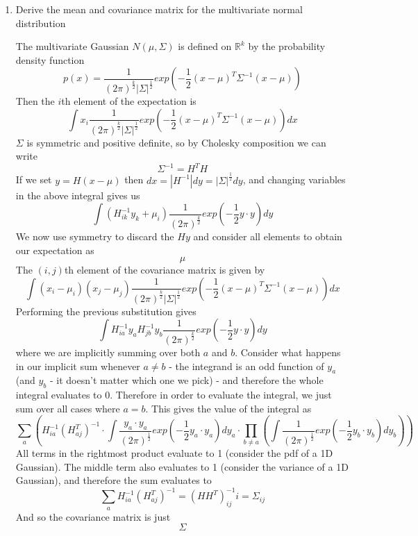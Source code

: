 \documentclass{article}
\newcommand{\chapternumber}{2}
\newenvironment{QandA}{\begin{enumerate}[label=\chapternumber.\arabic*]\bfseries\boldmath}
	{\end{enumerate}}
\newenvironment{answered}{\par\bigskip\normalfont\unboldmath}{}
\begin{document}
\begin{QandA}
		\item Derive the mean and covariance matrix for the multivariate normal distribution
		\begin{answered}
			The multivariate Gaussian $N(\mu,\Sigma)$ is defined on $\mathbb{R}^k$ by the probability density function
			\[p(x)=\frac{1}{(2\pi)^{\frac{k}{2}}|\Sigma|^{\frac{1}{2}}}exp\left(-\frac{1}{2}(x-\mu)^T\Sigma^{-1}(x-\mu)\right)\]
			Then the $i$th element of the expectation is
			\[\int x_i\frac{1}{(2\pi)^{\frac{k}{2}}|\Sigma|^{\frac{1}{2}}}exp\left(-\frac{1}{2}(x-\mu)^T\Sigma^{-1}(x-\mu)\right)dx\]
			$\Sigma$ is symmetric and positive definite, so by Cholesky composition we can write
			\[\Sigma^{-1}=H^TH\]
			If we set $y=H(x-\mu)$ then $dx=|H^{-1}|dy=|\Sigma|^\frac{1}{2}dy$,
			and changing variables in the above integral gives us
			\[\int (H^{-1}_{ik}y_k+ \mu_i)\frac{1}{(2\pi)^{\frac{k}{2}}}exp\left(-\frac{1}{2}y\cdot y\right)dy\]
			We now use symmetry to discard the $Hy$ and consider all elements to obtain our expectation as
			\[\mu\]
			The $(i,j)$th element of the covariance matrix is given by
			\[\int(x_i-\mu_i)(x_j-\mu_j) \frac{1}{(2\pi)^{\frac{k}{2}}|\Sigma|^{\frac{1}{2}}}exp\left(-\frac{1}{2}(x-\mu)^T\Sigma^{-1}(x-\mu)\right)dx\]
			Performing the previous substitution gives
			\[\int H^{-1}_{ia}y_aH^{-1}_{jb}y_b \frac{1}{(2\pi)^{\frac{k}{2}}}exp\left(-\frac{1}{2}y\cdot y\right)dy\] where we are implicitly summing over both $a$ and $b$. Consider what happens in our implicit sum whenever $a \neq b$ - the integrand is an odd function of $y_a$ (and $y_b$ - it doesn't matter which one we pick) - and therefore the whole integral evaluates to 0. Therefore in order to evaluate the integral, we just sum over all cases where $a=b$. This gives the value of the integral as
			\[\sum_a\left( H^{-1}_{ia}(H^{T}_{aj})^{-1}\cdot\int\frac{y_a\cdot y_a}{(2\pi)^{\frac{1}{2}}}exp\left(-\frac{1}{2}y_a\cdot y_a\right)dy_a \cdot\prod_{b\neq a}\left(\int\frac{1}{(2\pi)^{\frac{1}{2}}}exp\left(-\frac{1}{2}y_b\cdot y_b\right)dy_b\right)\right)\]
			All terms in the rightmost product evaluate to 1 (consider the pdf of a 1D Gaussian). The middle term also evaluates to 1 (consider the variance of a 1D Gaussian), and therefore the sum evaluates to
			\[\sum_a H^{-1}_{ia}(H^{T}_{aj})^{-1} = (HH^T)^{-1}_{ij}i=\Sigma_{ij}\]
			And so the covariance matrix is just
			\[\Sigma\] \end{answered}
		

\end{QandA}
\end{document}
